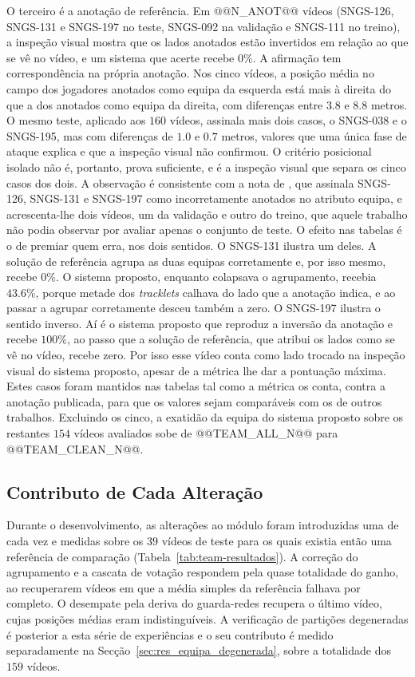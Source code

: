O terceiro é a anotação de referência. Em @@N_ANOT@@ vídeos (SNGS-126, SNGS-131 e SNGS-197 no
teste, SNGS-092 na validação e SNGS-111 no treino), a inspeção visual mostra que os lados anotados
estão invertidos em relação ao que se vê no vídeo, e um sistema que acerte recebe $0\%$. A afirmação
tem correspondência na própria anotação. Nos cinco vídeos, a posição média no campo dos jogadores
anotados como equipa da esquerda está mais à direita do que a dos anotados como equipa da direita,
com diferenças entre $3.8$ e $8.8$ metros. O mesmo teste, aplicado aos $160$ vídeos, assinala mais
dois casos, o SNGS-038 e o SNGS-195, mas com diferenças de $1.0$ e $0.7$ metros, valores que uma
única fase de ataque explica e que a inspeção visual não confirmou. O critério posicional isolado
não é, portanto, prova suficiente, e é a inspeção visual que separa os cinco casos dos dois. A
observação é consistente com
a nota de \citet{oo2026broadcast2pitch}, que assinala
SNGS-126, SNGS-131 e SNGS-197 como incorretamente anotados no atributo equipa, e acrescenta-lhe dois
vídeos, um da validação e outro do treino, que aquele trabalho não podia observar por avaliar apenas
o conjunto de teste. O efeito nas tabelas é o de premiar quem erra, nos dois sentidos. O SNGS-131 ilustra um deles. A
solução de referência agrupa as duas equipas corretamente e, por isso mesmo, recebe $0\%$. O sistema
proposto, enquanto colapsava o agrupamento, recebia $43.6\%$, porque metade dos \emph{tracklets}
calhava do lado que a anotação indica, e ao passar a agrupar corretamente desceu também a zero. O
SNGS-197 ilustra o sentido inverso. Aí é o sistema proposto que reproduz a inversão da anotação e
recebe $100\%$, ao passo que a solução de referência, que atribui os lados como se vê no vídeo,
recebe zero. Por isso esse vídeo conta como lado trocado na inspeção visual do sistema proposto,
apesar de a métrica lhe dar a pontuação máxima.
Estes casos foram mantidos nas tabelas tal como a métrica os conta, contra a anotação publicada,
para que os valores sejam comparáveis com os de outros trabalhos. Excluindo os cinco, a exatidão da
equipa do sistema proposto sobre os restantes $154$ vídeos avaliados sobe de @@TEAM_ALL_N@@ para
@@TEAM_CLEAN_N@@.

\subsection{Contributo de Cada Alteração}\label{sec:res_equipa_ablacao}

Durante o desenvolvimento, as alterações ao módulo foram introduzidas uma de cada vez e medidas
sobre os $39$ vídeos de teste para os quais existia então uma referência de comparação
(Tabela~\ref{tab:team-resultados}). A correção do agrupamento e a cascata de votação respondem pela
quase totalidade do ganho, ao recuperarem vídeos em que a média simples da referência falhava por
completo. O desempate pela deriva do guarda-redes recupera o último vídeo, cujas posições médias
eram indistinguíveis. A verificação de partições degeneradas é posterior a esta série de
experiências e o seu contributo é medido separadamente na
Secção~\ref{sec:res_equipa_degenerada}, sobre a totalidade dos $159$ vídeos.

